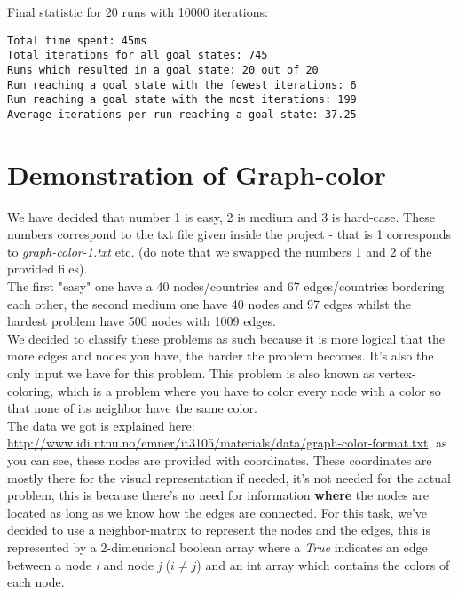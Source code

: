 \documentclass[12pt, a4paper]{article}
\begin{document}
Final statistic for 20 runs with 10000 iterations:
\begin{verbatim}
Total time spent: 45ms
Total iterations for all goal states: 745
Runs which resulted in a goal state: 20 out of 20
Run reaching a goal state with the fewest iterations: 6
Run reaching a goal state with the most iterations: 199
Average iterations per run reaching a goal state: 37.25
\end{verbatim}


\section{Demonstration of Graph-color}
We have decided that number 1 is easy, 2 is medium and 3 is hard-case.  These numbers correspond to the txt file given inside the project - that is 1 corresponds to \textit{graph-color-1.txt} etc. (do note that we swapped the numbers 1 and 2 of the provided files).\\
The first "easy" one have a 40 nodes/countries and 67 edges/countries bordering each other, the second medium one have 40 nodes and 97 edges whilst the hardest problem have 500 nodes with 1009 edges.\\ 
We decided to classify these problems as such because it is more logical that the more edges and nodes you have, the harder the problem becomes. It's also the only input we have for this problem.
This problem is also known as vertex-coloring, which is a problem where you have to color every node with a color so that none of its neighbor have the same color.\\
The data we got is explained here:\\ \href{http://www.idi.ntnu.no/emner/it3105/materials/data/graph-color-format.txt}{http://www.idi.ntnu.no/emner/it3105/materials/data/graph-color-format.txt},
as you can see, these nodes are provided with coordinates. These coordinates are mostly there for the visual representation if needed, it's not needed for the actual problem, this is because there's no need for information \textbf{where} the nodes are located as long as we know how the edges are connected. For this task, we've decided to use a neighbor-matrix to represent the nodes and the edges, this is represented by a 2-dimensional boolean array where a \textit{True} indicates an edge between a node \textit{i} and node \textit{j} ($i \neq j$) and an int array which contains the colors of each node.
\end{document}
